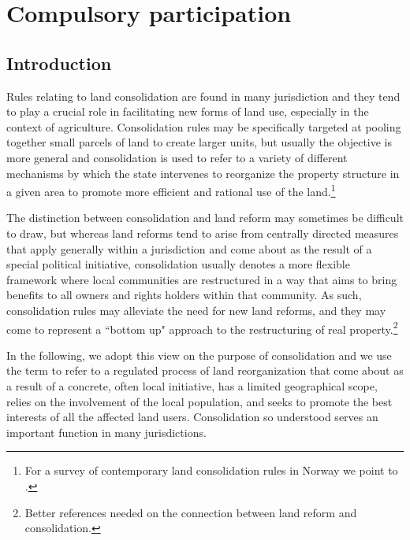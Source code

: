 \chapter{Compulsory participation}\label{chap:6}

\section{Introduction}\label{sec:intro6}

Rules relating to land consolidation are found in many jurisdiction and they tend to play a crucial role in facilitating new forms of land use, especially in the context of agriculture. Consolidation rules may be specifically targeted at pooling together small parcels of land to create larger units, but usually the objective is more general and consolidation is used to refer to a variety of different mechanisms by which the state intervenes to reorganize the property structure in a given area to promote more efficient and rational use of the land.\footnote{For a survey of contemporary land consolidation rules in Norway we point to \cite{vittikainen2004}.}

The distinction between consolidation and land reform may sometimes be difficult to draw, but whereas land reforms tend to arise from centrally directed measures that apply generally within a jurisdiction and come about as the result of a special political initiative, consolidation usually denotes a more flexible framework where local communities are restructured in a way that aims to bring benefits to all owners and rights holders within that community. As such, consolidation rules may alleviate the need for new land reforms, and they may come to represent a ``bottom up" approach to the restructuring of real property.\footnote{Better references needed on the connection between land reform and consolidation.}

In the following, we adopt this view on the purpose of consolidation and we use the term to refer to a regulated process of land reorganization that come about as a result of a concrete, often local initiative, has a limited geographical scope, relies on the involvement of the local population, and seeks to promote the best interests of all the affected land users. Consolidation so understood serves an important function in many jurisdictions. 

